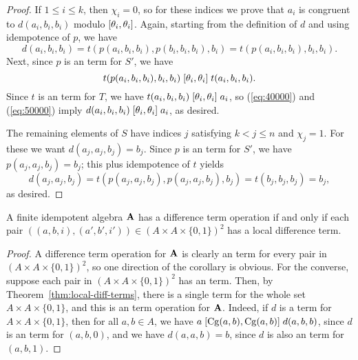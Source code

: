 \begin{proof}
If $1\leq i \leq k$, then $\chi_i =0$, so for these indices we prove
that $a_i$ is congruent to $d(a_i,b_i,b_i)$ modulo $[\theta_i, \theta_i]$.
Again, starting from the definition of $d$ and using idempotence of $p$, we have
\begin{equation}
  \label{eq:40000}
  d(a_i,b_i,b_i) =
  t(p(a_i,b_i,b_i), p(b_i,b_i,b_i), b_i)=
  t(p(a_i,b_i,b_i), b_i, b_i).
\end{equation}
Next, since $p$ is an \ld term for $S'$, we have
\begin{equation}
  \label{eq:50000}
  t(p(a_i,b_i,b_i), b_i, b_i)
 \mathrel{[\theta_i, \theta_i]}
 t(a_i, b_i, b_i).
\end{equation}
Since $t$ is an \ld term for $T$, 
we have
$t(a_i, b_i, b_i) \mathrel{[\theta_i, \theta_i]} a_i$, so 
(\ref{eq:40000}) and (\ref{eq:50000}) imply
$d(a_i,b_i,b_i) \mathrel{[\theta_i, \theta_i]} a_i$, as desired.

The remaining elements of $S$
have indices $j$ satisfying $k<j\leq n$ and $\chi_j = 1$.
For these we want $d(a_j,a_j,b_j) = b_j$.
Since $p$ is an \ld term for $S'$, we have
$p(a_j,a_j,b_j) = b_j$; this plus idempotence of $t$ yields
\[ d(a_j,a_j,b_j) =  t(p(a_j,a_j,b_j), p(a_j,a_j,b_j), b_j)=  t(b_j, b_j, b_j) =b_j,\]
as desired.
\end{proof}

\begin{corollary}
  \label{cor:loc-diff-term}
  A finite idempotent algebra $\mathbf{A}$ has a difference term operation if and
  only if each pair $((a,b,i), (a',b',i')) \in (A\times A \times \{0,1\})^2$ 
  has a local difference term.
\end{corollary}
\begin{proof}
  A difference term operation for $\mathbf{A}$ is clearly an \ld term for every pair in 
  $(A\times A \times \{0,1\})^2$, so one direction of the corollary is obvious.
  For the converse, suppose
  each pair in $(A\times A \times \{0,1\})^2$ has an \ld term. 
  Then, by Theorem~\ref{thm:local-diff-terms},
  there is a single \ld term for the whole set $A\times A \times \{0,1\}$,
  and this is an \ld term operation for $\mathbf{A}$.  Indeed, if $d$ is a
  \ld term for $A\times A \times \{0,1\}$, then
  for all $a, b \in A$, we have
  $a \mathrel{[\operatorname{Cg}(a,b), \operatorname{Cg}(a,b)]} d(a,b,b)$,
  since $d$ is an \ld term for $(a,b,0)$, and we have
  $d(a,a,b) = b$, since $d$ is also an \ld term for
  $(a,b,1)$.
\end{proof}

